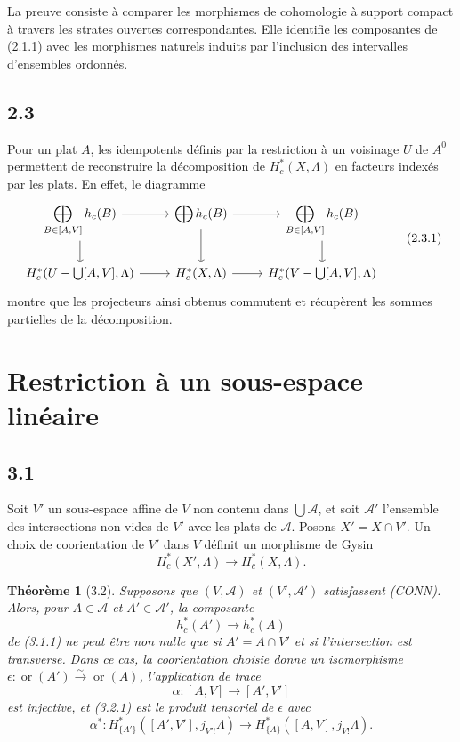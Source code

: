 \documentclass[11pt]{article}
\newtheorem{theorem}{Théorème}[section]
\theoremstyle{definition}
\newcommand{\ornt}{\operatorname{or}}
\begin{document}
La preuve consiste à comparer les morphismes de cohomologie à support compact à travers les strates ouvertes correspondantes. Elle identifie les composantes de (2.1.1) avec les morphismes naturels induits par l'inclusion des intervalles d'ensembles ordonnés.

\subsection*{2.3}
Pour un plat $A$, les idempotents définis par la restriction à un voisinage $U$ de $A^0$ permettent de reconstruire la décomposition de $H_c^*(X,\Lambda)$ en facteurs indexés par les plats. En effet, le diagramme
\begin{equation}
\begin{tikzcd}
\displaystyle\bigoplus_{B\in[A,V]}h_c(B) \arrow[r] \arrow[d] & \displaystyle\bigoplus h_c(B) \arrow[r] \arrow[d] & \displaystyle\bigoplus_{B\in[A,V]}h_c(B) \arrow[d]\\
H_c^*(U-\bigcup[A,V],\Lambda) \arrow[r] & H_c^*(X,\Lambda) \arrow[r] & H_c^*(V-\bigcup[A,V],\Lambda)
\end{tikzcd}\tag{2.3.1}
\end{equation}
montre que les projecteurs ainsi obtenus commutent et récupèrent les sommes partielles de la décomposition.

\section{Restriction à un sous-espace linéaire}

\subsection*{3.1}
Soit $V'$ un sous-espace affine de $V$ non contenu dans $\bigcup\mathcal A$, et soit $\mathcal A'$ l'ensemble des intersections non vides de $V'$ avec les plats de $\mathcal A$. Posons $X'=X\cap V'$. Un choix de coorientation de $V'$ dans $V$ définit un morphisme de Gysin
\begin{equation}
H_c^*(X',\Lambda)\longrightarrow H_c^*(X,\Lambda).\tag{3.1.1}
\end{equation}

\begin{theorem}[3.2]
Supposons que $(V,\mathcal A)$ et $(V',\mathcal A')$ satisfassent \textup{(CONN)}. Alors, pour $A\in\mathcal A$ et $A'\in\mathcal A'$, la composante
\begin{equation}
h_c^*(A')\longrightarrow h_c^*(A)\tag{3.2.1}
\end{equation}
de (3.1.1) ne peut être non nulle que si $A'=A\cap V'$ et si l'intersection est transverse. Dans ce cas, la coorientation choisie donne un isomorphisme $\epsilon:\ornt(A')\xrightarrow{\sim}\ornt(A)$, l'application de trace
\[
\alpha:[A,V]\longrightarrow[A',V']
\]
est injective, et (3.2.1) est le produit tensoriel de $\epsilon$ avec
\begin{equation}
\alpha^*:H^*_{\{A'\}}([A',V'],j_{V'!}\Lambda)\longrightarrow H^*_{\{A\}}([A,V],j_{V!}\Lambda).\tag{3.2.2}
\end{equation}
\end{theorem}
\end{document}
